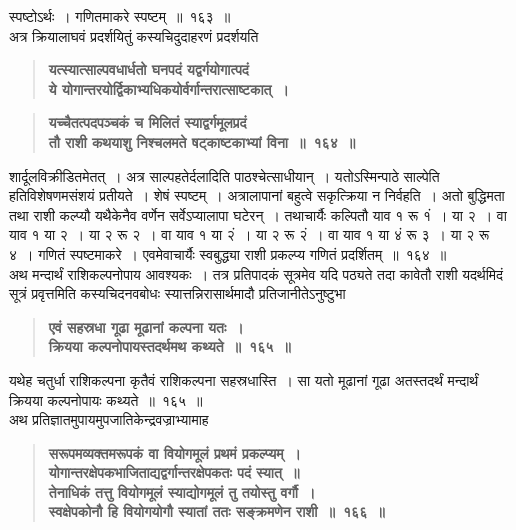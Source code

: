 \documentclass[11pt, openany]{book}
\begin{document}
\begin{sloppypar}
स्पष्टोऽर्थः~। गणितमाकरे स्पष्टम्~॥~१६३~॥\\

{\small अत्र क्रियालाघवं प्रदर्शयितुं कस्यचिदुदाहरणं प्रदर्शयति\textendash }

 \label{10.164.1}
\begin{quote}
{\large \textbf{{\color{purple}यत्स्यात्साल्पवधार्धतो घनपदं यद्वर्गयोगात्पदं\\
ये योगान्तरयोर्द्विकाभ्यधिकयोर्वर्गान्तरात्साष्टकात्~।}}}
\end{quote}
\end{sloppypar}

\newpage

\begin{sloppypar}
 \label{10.164}
\begin{quote}
{\large \textbf{{\color{purple}यच्चैतत्पदपञ्चकं च मिलितं स्याद्वर्गमूलप्रदं\\
तौ राशी कथयाशु निश्चलमते षट्काष्टकाभ्यां विना~॥~१६४~॥}}}
\end{quote}

शार्दूलविक्रीडितमेतत्~। अत्र साल्पहतेर्दलादिति पाठश्चेत्साधीयान्~। यतोऽस्मिन्पाठे साल्पेति हतिविशेषणमसंशयं प्रतीयते~। शेषं स्पष्टम्~। अत्रालापानां बहुत्वे सकृत्क्रिया न निर्वहति~। अतो बुद्धिमता तथा राशी कल्प्यौ यथैकेनैव वर्णेन सर्वेऽप्यालापा घटेरन्~। तथाचार्यैः कल्पितौ याव १ रू १ं~। या २~। वा याव १ या २~। या २ रू २~। वा याव १ या २ं~। या २ रू २ं~। वा याव १ या ४ं रू ३~। या २ रू ४~। गणितं स्पष्टमाकरे~। एवमेवाचार्यैः स्वबुद्ध्या राशी प्रकल्प्य गणितं प्रदर्शितम्~॥~१६४~॥\\

{\small अथ मन्दार्थं राशिकल्पनोपाय आवश्यकः~। तत्र प्रतिपादकं सूत्रमेव यदि पठ्यते तदा कावेतौ राशी यदर्थमिदं सूत्रं प्रवृत्तमिति कस्यचिदनवबोधः स्यात्तन्निरासार्थमादौ प्रतिजानीतेऽनुष्टुभा\textendash }

 \label{10.165}
\begin{quote}
{\large \textbf{{\color{purple}एवं सहस्रधा गूढा मूढानां कल्पना यतः~।\\
क्रियया कल्पनोपायस्तदर्थमथ कथ्यते~॥~१६५~॥}}}
\end{quote}

यथेह चतुर्धा राशिकल्पना कृतैवं राशिकल्पना सहस्रधास्ति~। सा यतो मूढानां गूढा अतस्तदर्थं मन्दार्थं क्रियया कल्पनोपायः कथ्यते~॥~१६५~॥\\

{\small अथ प्रतिज्ञातमुपायमुपजातिकेन्द्रवज्राभ्यामाह\textendash }

 \label{10.166}
\begin{quote}
{\large \textbf{{\color{purple}सरूपमव्यक्तमरूपकं वा वियोगमूलं प्रथमं प्रकल्प्यम्~।\\
योगान्तरक्षेपकभाजिताद्यद्वर्गान्तरक्षेपकतः पदं स्यात्~॥\\
तेनाधिकं तत्तु वियोगमूलं स्याद्योगमूलं तु तयोस्तु वर्गौ~।\\
स्वक्षेपकोनौ हि वियोगयोगौ स्यातां ततः सङ्क्रमणेन राशी~॥~१६६~॥}}}
\end{quote}


\end{sloppypar}
\end{document}
